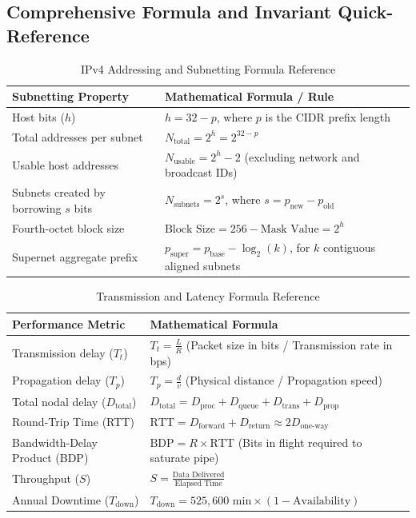 \subsection{Comprehensive Formula and Invariant Quick-Reference}

\begin{table}[htbp]
\centering
\caption{IPv4 Addressing and Subnetting Formula Reference}
\label{tab:formulas_ipv4_subnetting}
\begin{tabularx}{\textwidth}{p{4.8cm} X}
\toprule
\textbf{Subnetting Property} & \textbf{Mathematical Formula / Rule} \\
\midrule
Host bits ($h$) & $h = 32 - p$, where $p$ is the CIDR prefix length \\
Total addresses per subnet & $N_{\text{total}} = 2^h = 2^{32-p}$ \\
Usable host addresses & $N_{\text{usable}} = 2^h - 2$ (excluding network and broadcast IDs) \\
Subnets created by borrowing $s$ bits & $N_{\text{subnets}} = 2^s$, where $s = p_{\text{new}} - p_{\text{old}}$ \\
Fourth-octet block size & $\text{Block Size} = 256 - \text{Mask Value} = 2^h$ \\
Supernet aggregate prefix & $p_{\text{super}} = p_{\text{base}} - \log_2(k)$, for $k$ contiguous aligned subnets \\
\bottomrule
\end{tabularx}
\end{table}

\begin{table}[htbp]
\centering
\caption{Transmission and Latency Formula Reference}
\label{tab:formulas_transmission_latency}
\begin{tabularx}{\textwidth}{p{4.8cm} X}
\toprule
\textbf{Performance Metric} & \textbf{Mathematical Formula} \\
\midrule
Transmission delay ($T_t$) & $T_t = \frac{L}{R}$ (Packet size in bits / Transmission rate in bps) \\
Propagation delay ($T_p$) & $T_p = \frac{d}{v}$ (Physical distance / Propagation speed) \\
Total nodal delay ($D_{\text{total}}$) & $D_{\text{total}} = D_{\text{proc}} + D_{\text{queue}} + D_{\text{trans}} + D_{\text{prop}}$ \\
Round-Trip Time (RTT) & $\text{RTT} = D_{\text{forward}} + D_{\text{return}} \approx 2 D_{\text{one-way}}$ \\
Bandwidth-Delay Product (BDP) & $\text{BDP} = R \times \text{RTT}$ (Bits in flight required to saturate pipe) \\
Throughput ($S$) & $S = \frac{\text{Data Delivered}}{\text{Elapsed Time}}$ \\
Annual Downtime ($T_{\text{down}}$) & $T_{\text{down}} = 525,600\text{ min} \times (1 - \text{Availability})$ \\
\bottomrule
\end{tabularx}
\end{table}

